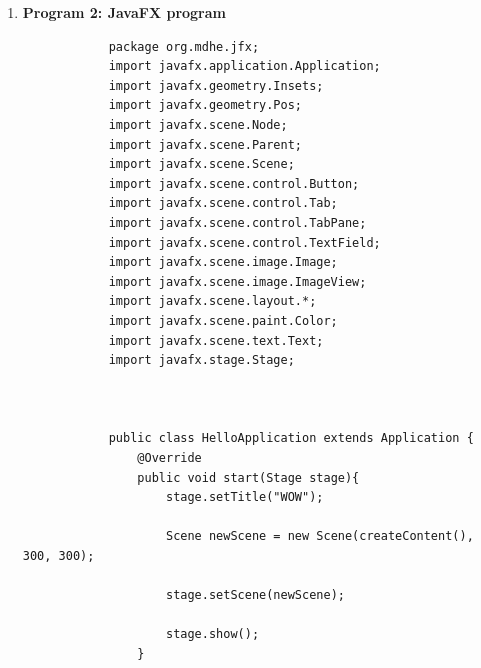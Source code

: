 \documentclass{book}
\begin{document}
{\begin{enumerate}
\begin{itemize}
\begin{itemize}
{                }
                \item{ \textbf{View Frame}
                }
            \end{itemize}


        \end{itemize}

        \item \textbf{Program 2: JavaFX program}

        \begin{verbatim}
            package org.mdhe.jfx;
            import javafx.application.Application;
            import javafx.geometry.Insets;
            import javafx.geometry.Pos;
            import javafx.scene.Node;
            import javafx.scene.Parent;
            import javafx.scene.Scene;
            import javafx.scene.control.Button;
            import javafx.scene.control.Tab;
            import javafx.scene.control.TabPane;
            import javafx.scene.control.TextField;
            import javafx.scene.image.Image;
            import javafx.scene.image.ImageView;
            import javafx.scene.layout.*;
            import javafx.scene.paint.Color;
            import javafx.scene.text.Text;
            import javafx.stage.Stage;



            public class HelloApplication extends Application {
                @Override
                public void start(Stage stage){
                    stage.setTitle("WOW");

                    Scene newScene = new Scene(createContent(), 300, 300);

                    stage.setScene(newScene);

                    stage.show();
                }


\end{verbatim}
\end{enumerate}}
\end{document}
